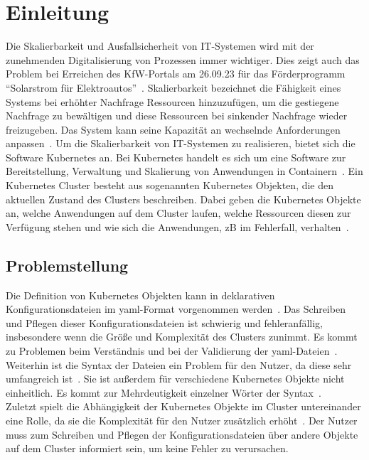 \chapter{Einleitung}\label{ch:introduction}

Die Skalierbarkeit und Ausfallsicherheit von IT-Systemen wird mit der zunehmenden Digitalisierung von Prozessen immer wichtiger.
Dies zeigt auch das Problem bei Erreichen des KfW-Portals am 26.09.23 für das Förderprogramm ``Solarstrom für Elektroautos''~\cite{kfw-not-reachable}.
Skalierbarkeit bezeichnet die Fähigkeit eines Systems bei erhöhter Nachfrage Ressourcen hinzuzufügen, um die gestiegene Nachfrage zu bewältigen und
diese Ressourcen bei sinkender Nachfrage wieder freizugeben. Das System kann seine Kapazität an wechselnde Anforderungen anpassen~\cite{it-system-scaling}.
Um die Skalierbarkeit von IT-Systemen zu realisieren, bietet sich die Software Kubernetes an.
Bei Kubernetes handelt es sich um eine Software zur Bereitstellung, Verwaltung und Skalierung von Anwendungen in Containern~\cite{kubernetes-overview}.
Ein Kubernetes Cluster besteht aus sogenannten Kubernetes Objekten, die den aktuellen Zustand des Clusters beschreiben. Dabei geben die Kubernetes Objekte an,
welche Anwendungen auf dem Cluster laufen, welche Ressourcen diesen zur Verfügung stehen und wie sich die Anwendungen, \acs{zB} im Fehlerfall, verhalten~\cite{kubernetes-objects}.

\section{Problemstellung}\label{sec:problem}

Die Definition von Kubernetes Objekten kann in deklarativen Konfigurationsdateien im \ac{yaml}-Format vorgenommen werden~\cite{kubernetes-config-declarative}.
Das Schreiben und Pflegen dieser Konfigurationsdateien ist schwierig und fehleranfällig,
insbesondere wenn die Größe und Komplexität des Clusters zunimmt.
Es kommt zu Problemen beim Verständnis und bei der Validierung der \ac{yaml}-Dateien~\cite{dev-to-kubernetes-challenges,kubetools-io-kubernetes-manifest-management}.
\\
Weiterhin ist die Syntax der Dateien ein Problem für den Nutzer, da diese sehr umfangreich ist~\cite{entwickler-de-kubernetes-problems}.
Sie ist außerdem für verschiedene Kubernetes Objekte nicht einheitlich.
Es kommt zur Mehrdeutigkeit einzelner Wörter der Syntax~\cite{dev-to-kubernetes-challenges}.
\\
Zuletzt spielt die Abhängigkeit der Kubernetes Objekte im Cluster untereinander eine Rolle,
da sie die Komplexität für den Nutzer zusätzlich erhöht~\cite{spacelift-io-kubernetes-challenges,newstack-io-kubernetes-manifest-lifecycle}.
Der Nutzer muss zum Schreiben und Pflegen der Konfigurationsdateien über andere Objekte auf dem Cluster informiert sein, um
keine Fehler zu verursachen.

